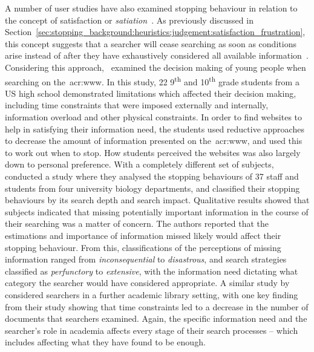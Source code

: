 
A number of user studies have also examined stopping behaviour in relation to the concept of satisfaction or \emph{satiation}~\citep{simon1955satiation}. As previously discussed in Section~\ref{sec:stopping_background:heuristics:judgement:satisfaction_frustration}, this concept suggests that a searcher will cease searching as soon as conditions arise instead of after they have exhaustively considered all available information~\citep{march1994primer}. Considering this approach,~\cite{agosto2002satisficing} examined the decision making of young people when searching on the~\gls{acr:www}. In this study, 22 9\textsuperscript{th} and 10\textsuperscript{th} grade students from a US high school demonstrated limitations which affected their decision making, including time constraints that were imposed externally and internally, information overload and other physical constraints. In order to find websites to help in satisfying their information need, the students used reductive approaches to decrease the amount of information presented on the~\gls{acr:www}, and used this to work out when to stop. How students perceived the websites was also largely down to personal preference. With a completely different set of subjects,~\cite{mansourian2007search} conducted a study where they analysed the stopping behaviours of 37 staff and students from four university biology departments, and classified their stopping behaviours by its search depth and search impact. Qualitative results showed that subjects indicated that missing potentially important information in the course of their searching was a matter of concern. The authors reported that the estimations and importance of information missed likely would affect their stopping behaviour. From this, classifications of the perceptions of missing information ranged from \emph{inconsequential} to \emph{disastrous}, and search strategies classified as \emph{perfunctory} to \emph{extensive}, with the information need dictating what category the searcher would have considered appropriate. A similar study by~\cite{prabha2007enough} considered searchers in a further academic library setting, with one key finding from their study showing that time constraints led to a decrease in the number of documents that searchers examined. Again, the specific information need and the searcher's role in academia affects every stage of their search processes -- which includes affecting what they have found to be enough.


